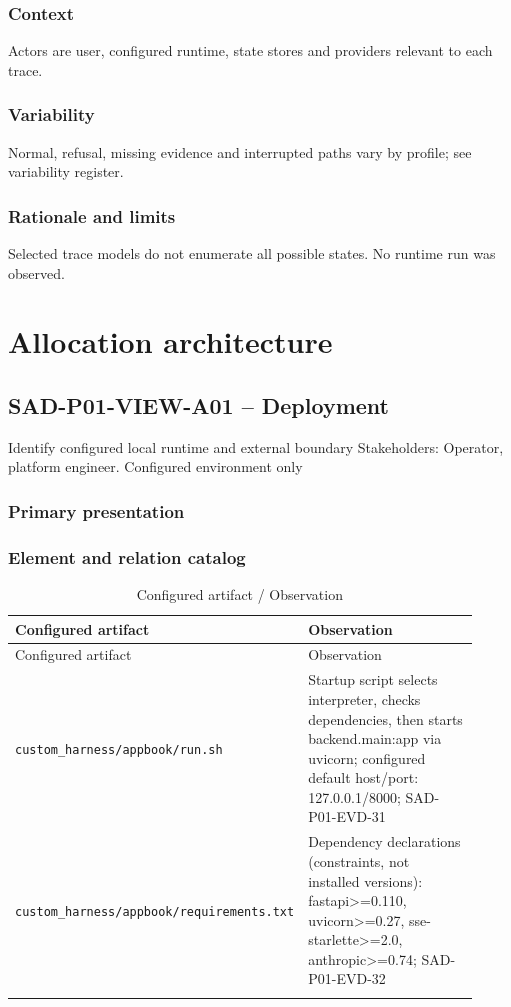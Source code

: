 \documentclass[10pt,letterpaper]{article}
\begin{document}
\subsubsection{Context}
Actors are user, configured runtime, state stores and providers relevant to each trace.
\subsubsection{Variability}
Normal, refusal, missing evidence and interrupted paths vary by profile; see variability register.
\subsubsection{Rationale and limits}
Selected trace models do not enumerate all possible states. No runtime run was observed.

\section{Allocation architecture}
\subsection{SAD-P01-VIEW-A01 -- Deployment}
Identify configured local runtime and external boundary Stakeholders: Operator, platform engineer. Configured environment only
\subsubsection{Primary presentation}

\subsubsection{Element and relation catalog}
\begin{longtable}{@{}>{\raggedright\arraybackslash}p{0.38\linewidth}>{\raggedright\arraybackslash}p{0.54\linewidth}@{}}
\caption{Configured artifact / Observation}\\
\toprule Configured artifact & Observation\\\midrule\endfirsthead
\toprule Configured artifact & Observation\\\midrule\endhead
\nolinkurl{custom_harness/appbook/run.sh} & Startup script selects interpreter, checks dependencies, then starts backend.main:app via uvicorn; configured default host/port: 127.0.0.1/8000; SAD-P01-EVD-31\\\addlinespace
\nolinkurl{custom_harness/appbook/requirements.txt} & Dependency declarations (constraints, not installed versions): fastapi>=0.110, uvicorn>=0.27, sse-starlette>=2.0, anthropic>=0.74; SAD-P01-EVD-32\\\addlinespace
\bottomrule\end{longtable}
\end{document}
